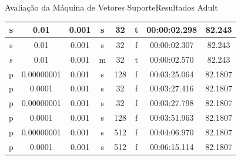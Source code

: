 \documentclass{beamer}
\begin{document}
\begin{frame}{Avaliação da Máquina de Vetores Suporte}{Resultados Adult}
\begin{table}
\begin{tabular}{|c|c|c|c|c|c|c|c|}
		s & 0.01 & 0.001 & s & 32 & t & 00:00:02.298 & 82.243\\ \hline
		s & 0.01 & 0.001 & s & 32 & f & 00:00:02.307 & 82.243\\ \hline
		s & 0.01 & 0.001 & m & 32 & t & 00:00:02.570 & 82.243\\ \hline
		p & 0.00000001 & 0.001 & s & 128 & f & 00:03:25.064 & 82.1807\\ \hline
		p & 0.0001 & 0.001 & s & 32 & f & 00:03:27.416 & 82.1807\\ \hline
		p & 0.00000001 & 0.001 & s & 32 & f & 00:03:27.798 & 82.1807\\ \hline
		p & 0.0001 & 0.001 & s & 128 & f & 00:03:51.963 & 82.1807\\ \hline
		p & 0.00000001 & 0.001 & s & 512 & f & 00:04:06.970 & 82.1807\\ \hline
		p & 0.0001 & 0.001 & s & 512 & f & 00:06:15.114 & 82.1807\\ \hline
    \end{tabular}
\end{table}
\end{frame}
\end{document}
